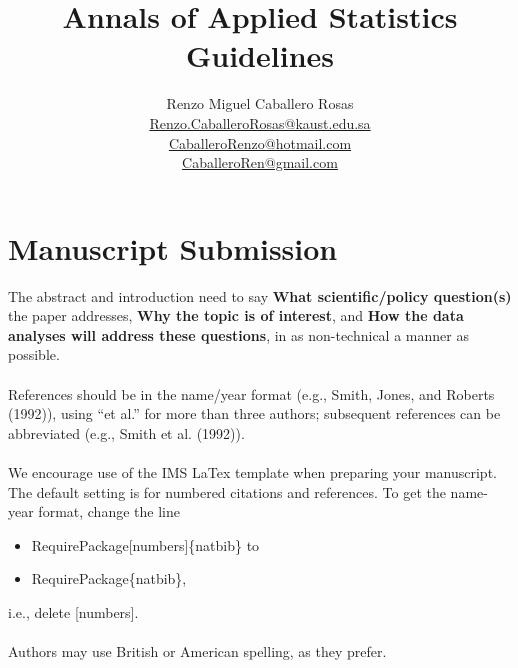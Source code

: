 \documentclass[12pt]{article}
\theoremstyle{definition}
\theoremstyle{remark}
\begin{document}
\title{Annals of Applied Statistics Guidelines}
\author{Renzo Miguel Caballero Rosas\\
\url{Renzo.CaballeroRosas@kaust.edu.sa}\\
\url{CaballeroRenzo@hotmail.com}\\
\url{CaballeroRen@gmail.com}} 
\maketitle

\tableofcontents

\section{Manuscript Submission}

The abstract and introduction need to say \textbf{What scientific/policy question(s)} the paper addresses, \textbf{Why the topic is of interest}, and \textbf{How the data analyses will address these questions}, in as non-technical a manner as possible.\\
\quad\\
References should be in the name/year format (e.g., Smith, Jones, and Roberts (1992)), using “et al.” for more than three authors; subsequent references can be abbreviated (e.g., Smith et al. (1992)).\\
\quad\\
We encourage use of the IMS LaTex template when preparing your manuscript. The default setting is for numbered citations and references. To get the name-year format, change the line
\begin{itemize}

\item RequirePackage[numbers]\{natbib\} to
\item RequirePackage\{natbib\},

\end{itemize}
i.e., delete [numbers].\\
\quad\\
Authors may use British or American spelling, as they prefer.
\end{document}
